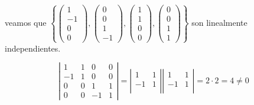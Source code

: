 \begin{ejercicio}
\begin{enumerate}
        veamos que $\left\{
            \left(\begin{array}{r}
                 1 \\ -1 \\ 0 \\ 0
            \end{array} \right),
            \left(\begin{array}{r}
                  0 \\ 0 \\ 1 \\ -1
            \end{array} \right),
            \left(\begin{array}{r}
                 1 \\ 1 \\ 0 \\ 0
            \end{array} \right),
            \left(\begin{array}{r}
                  0 \\ 0 \\ 1 \\ 1
            \end{array} \right)
            \right\}$ son linealmente independientes.

        \begin{equation*}
            \left|\begin{array}{cccc}
                1 & 1 & 0 & 0 \\
                -1 & 1 & 0 & 0 \\
                0 & 0 & 1 & 1 \\
                0 & 0 & -1 & 1
            \end{array} \right|=
            \left|\begin{array}{cc}
                1 & 1  \\
                -1 & 1 \\
            \end{array} \right|
            \left|\begin{array}{cc}
                1 & 1  \\
                -1 & 1 \\
            \end{array} \right| = 2\cdot 2 = 4 \neq 0
        \end{equation*}


\end{enumerate}
\end{ejercicio}
